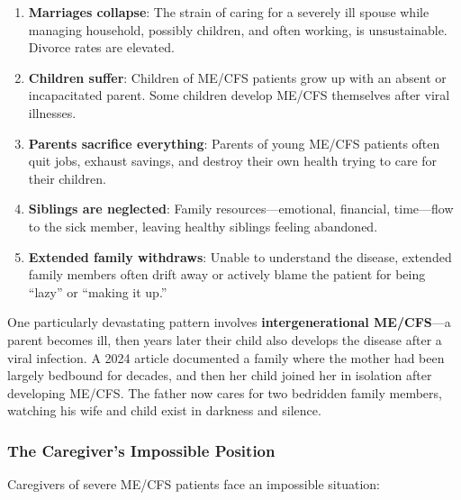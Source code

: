 \begin{enumerate}
    \item \textbf{Marriages collapse}: The strain of caring for a severely ill spouse while managing household, possibly children, and often working, is unsustainable. Divorce rates are elevated.

    \item \textbf{Children suffer}: Children of ME/CFS patients grow up with an absent or incapacitated parent. Some children develop ME/CFS themselves after viral illnesses.

    \item \textbf{Parents sacrifice everything}: Parents of young ME/CFS patients often quit jobs, exhaust savings, and destroy their own health trying to care for their children.

    \item \textbf{Siblings are neglected}: Family resources---emotional, financial, time---flow to the sick member, leaving healthy siblings feeling abandoned.

    \item \textbf{Extended family withdraws}: Unable to understand the disease, extended family members often drift away or actively blame the patient for being ``lazy'' or ``making it up.''
\end{enumerate}

One particularly devastating pattern involves \textbf{intergenerational ME/CFS}---a parent becomes ill, then years later their child also develops the disease after a viral infection. A 2024 article documented a family where the mother had been largely bedbound for decades, and then her child joined her in isolation after developing ME/CFS. The father now cares for two bedridden family members, watching his wife and child exist in darkness and silence.

\subsubsection{The Caregiver's Impossible Position}
\label{subsec:caregiver-impossible}

Caregivers of severe ME/CFS patients face an impossible situation:

